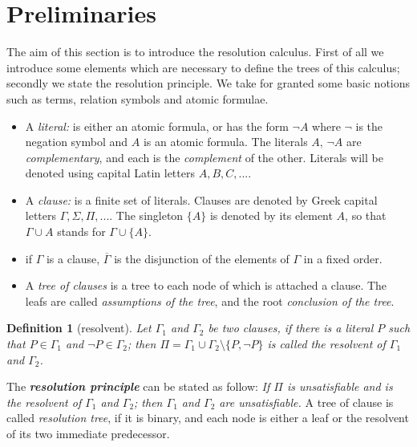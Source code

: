 \documentclass[a4paper,12pt,oneside]{book}
\newtheorem{definition}[theorem]{Definition}
\begin{document}
\section{Preliminaries}
The aim of this section is to introduce the resolution calculus. First of all we introduce some elements which are necessary to define the trees of this calculus; secondly we state the resolution principle. We take for granted some basic notions such as terms, relation symbols and atomic formulae. 
\begin{itemize}
\item A \textit{literal:} is either an atomic formula, or has the form $\neg A$ where $\neg$ is the negation symbol and $A$ is an atomic formula. The literals $A,\,\neg A$ are \textit{complementary}, and each is the \textit{complement} of the other. Literals will be denoted using capital Latin letters $A,B,C,...$.
\item A \textit{clause:} is a finite set of literals. Clauses are denoted by Greek capital letters $\Gamma,\Sigma ,\Pi,...$. The singleton $\{A\}$ is denoted by its element $A$, so that $\Gamma\cup A$ stands for $\Gamma\cup\{A\}$.
\item if $\Gamma$ is a clause, $\overline{\Gamma}$ is the disjunction of the elements of $\Gamma$ in a fixed order.
\item A \textit{tree of clauses} is a tree to each node of which is attached a clause. The leafs are called \textit{assumptions of the tree}, and the root \textit{conclusion of the tree}.
\end{itemize}

\begin{definition}[resolvent]
Let $\Gamma_1$ and $\Gamma_2$ be two clauses, if there is a literal $P$ such that $P\in\Gamma_1$ and $\neg P\in\Gamma_2$; then $\Pi =\Gamma_1\cup\Gamma_2\setminus\{P,\neg P\}$ is called the resolvent of $\Gamma_1$ and $\Gamma_2$.
\end{definition}
The \textit{\textbf{resolution principle}} can be stated as follow:
\textit{If $\Pi$ is unsatisfiable and is the resolvent of  $\Gamma_1$ and $\Gamma_2$; then  $\Gamma_1$ and $\Gamma_2$ are unsatisfiable.}
A tree of clause is called \textit{resolution tree}, if it is binary, and each node is either a leaf or the resolvent of its two immediate predecessor.
\end{document}
